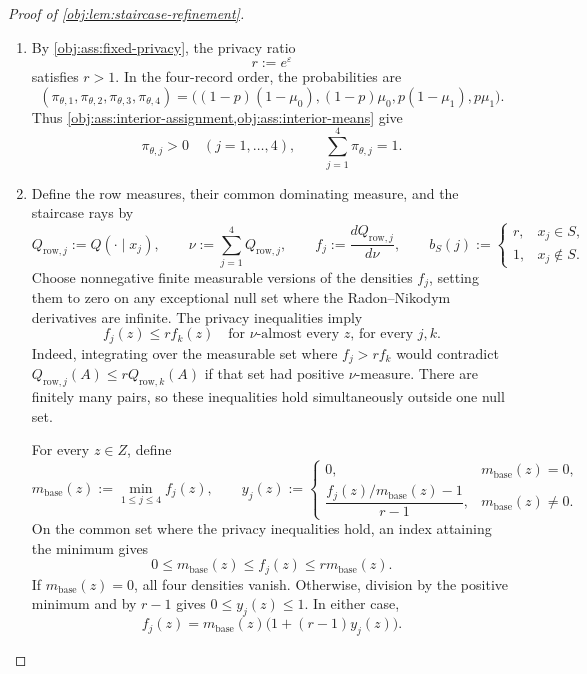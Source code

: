 \begin{proof}[Proof of \cref{obj:lem:staircase-refinement}]
\begin{enumerate}
\item
By \cref{obj:ass:fixed-privacy}, the privacy ratio
\[
r:=e^\varepsilon
\]
satisfies \(r>1\). In the four-record order, the probabilities are
\[
(\pi_{\theta,1},\pi_{\theta,2},\pi_{\theta,3},\pi_{\theta,4})
=
\bigl((1-p)(1-\mu_0),(1-p)\mu_0,
      p(1-\mu_1),p\mu_1\bigr).
\]
Thus \cref{obj:ass:interior-assignment,obj:ass:interior-means} give
\[
\pi_{\theta,j}>0\quad(j=1,\ldots,4),
\qquad
\sum_{j=1}^{4}\pi_{\theta,j}=1.
\]

\item
Define the row measures, their common dominating measure, and the staircase rays by
\[
Q_{\mathrm{row},j}:=Q(\cdot\mid x_j),\qquad
\nu:=\sum_{j=1}^{4}Q_{\mathrm{row},j},\qquad
f_j:=\frac{dQ_{\mathrm{row},j}}{d\nu},
\qquad
b_S(j):=
\begin{cases}
r,&x_j\in S,\\
1,&x_j\notin S.
\end{cases}
\]
Choose nonnegative finite measurable versions of the densities \(f_j\), setting them to zero on any exceptional null set where the Radon--Nikodym derivatives are infinite. The privacy inequalities imply
\[
f_j(z)\le r f_k(z)
\quad\text{for \(\nu\)-almost every \(z\), for every \(j,k\)}.
\]
Indeed, integrating over the measurable set where \(f_j>rf_k\) would contradict
\(Q_{\mathrm{row},j}(A)\le rQ_{\mathrm{row},k}(A)\) if that set had positive \(\nu\)-measure. There are finitely many pairs, so these inequalities hold simultaneously outside one null set.

For every \(z\in Z\), define
\[
m_{\mathrm{base}}(z):=\min_{1\le j\le4}f_j(z),
\qquad
y_j(z):=
\begin{cases}
0,&m_{\mathrm{base}}(z)=0,\\[2mm]
\dfrac{f_j(z)/m_{\mathrm{base}}(z)-1}{r-1},
   &m_{\mathrm{base}}(z)\ne0.
\end{cases}
\]
On the common set where the privacy inequalities hold, an index attaining the minimum gives
\[
0\le m_{\mathrm{base}}(z)\le f_j(z)
   \le r m_{\mathrm{base}}(z).
\]
If \(m_{\mathrm{base}}(z)=0\), all four densities vanish. Otherwise, division by the positive minimum and by \(r-1\) gives \(0\le y_j(z)\le1\). In either case,
\[
f_j(z)=m_{\mathrm{base}}(z)\bigl(1+(r-1)y_j(z)\bigr).
\]


\end{enumerate}
\end{proof}
